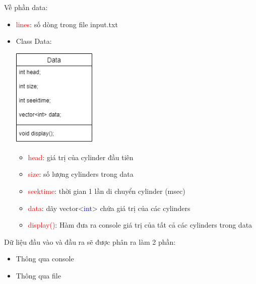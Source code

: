 \documentclass{report}
\begin{document}
        Về phần data:
        \begin{itemize}
            \item \textcolor{red}{lines}: số dòng trong file input.txt
            \item Class Data:
                \begin{multicols}{2}
                    \begin{minipage}{3cm}
                        \includegraphics[width=4cm]{images/Data.png}
                    \end{minipage}
                    \hspace{1cm}
                    \begin{minipage}{10cm}
                        \begin{itemize}
                            \item \textcolor{red}{head}: giá trị của cylinder đầu tiên
                            \item \textcolor{red}{size}: số lượng cylinders trong data 
                            \item \textcolor{red}{seektime}: thời gian 1 lần di chuyển cylinder (msec)
                            \item \textcolor{red}{data}: dãy vector<\textcolor{blue}{int}> chứa giá trị của các cylinders
                            \item \textcolor{red}{display()}: Hàm đưa ra console giá trị của tất cả các cylinders trong data
                        \end{itemize}
                    \end{minipage}
                \end{multicols}
        \end{itemize}
        
        Dữ liệu đầu vào và đầu ra sẽ được phân ra làm 2 phần:
        
        \begin{itemize}
            \item Thông qua console
            \item Thông qua file
                
        \end{itemize}
        
\end{document}
